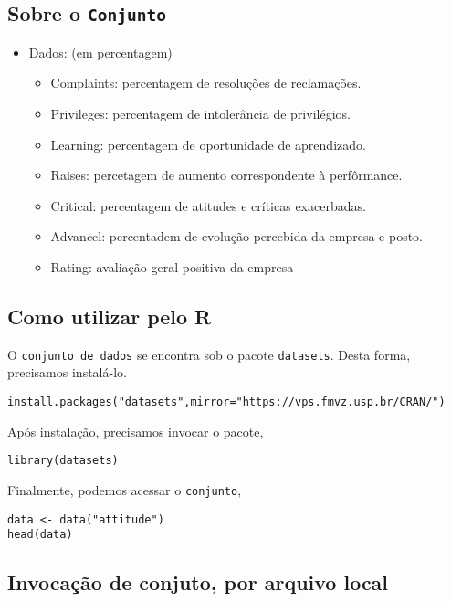 \documentclass[12pt]{abntex2}
\begin{document}
\subsection{Sobre o \texttt{Conjunto}}
\label{sec:org29595b6}
\begin{itemize}
\item Dados: (em percentagem)
\begin{itemize}
\item Complaints: percentagem de resoluções de reclamações.
\item Privileges: percentagem de intolerância de privilégios.
\item Learning: percentagem de oportunidade de aprendizado.
\item Raises: percetagem de aumento correspondente à perfôrmance.
\item Critical: percentagem de atitudes e críticas exacerbadas.
\item Advancel: percentadem de evolução percebida da empresa e posto.
\item Rating: avaliação geral positiva da empresa
\end{itemize}
\end{itemize}

\subsection{Como utilizar pelo R}
\label{sec:orgcfe5e00}
O \texttt{conjunto de dados} se encontra sob o pacote \texttt{datasets}. Desta forma, precisamos
instalá-lo.

\begin{verbatim}
install.packages("datasets",mirror="https://vps.fmvz.usp.br/CRAN/")
\end{verbatim}

Após instalação, precisamos invocar o pacote,
\begin{verbatim}
library(datasets)
\end{verbatim}

Finalmente, podemos acessar o \texttt{conjunto},
\begin{verbatim}
data <- data("attitude")
head(data)
\end{verbatim}
\subsection{Invocação de conjuto, por arquivo local}
\label{sec:org2caac3c}
\end{document}
